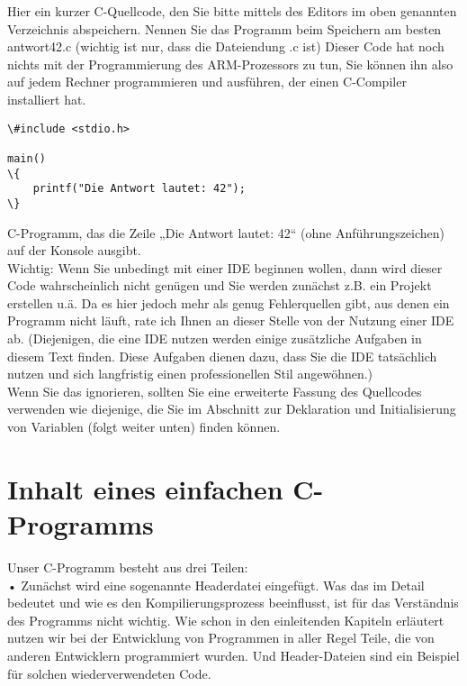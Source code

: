 Hier ein kurzer C-Quellcode, den Sie bitte mittels des Editors im oben genannten Verzeichnis abspeichern. Nennen Sie das Programm beim Speichern am besten antwort42.c (wichtig ist nur, dass die Dateiendung .c ist) Dieser Code hat noch nichts mit der Programmierung des ARM-Prozessors zu tun, Sie können ihn also auf jedem Rechner programmieren und ausführen, der einen C-Compiler installiert hat.\\

\begin{verbatim}
\#include <stdio.h>

main() 
\{
	printf("Die Antwort lautet: 42");
\}
\end{verbatim}

C-Programm, das die Zeile „Die Antwort lautet: 42“ (ohne Anführungszeichen) auf der Konsole ausgibt.\\

Wichtig: Wenn Sie unbedingt mit einer IDE beginnen wollen, dann wird dieser Code wahrscheinlich nicht genügen und Sie werden zunächst z.B. ein Projekt erstellen u.ä. Da es hier jedoch mehr als genug Fehlerquellen gibt, aus denen ein Programm nicht läuft, rate ich Ihnen an dieser Stelle von der Nutzung einer IDE ab. (Diejenigen, die eine IDE nutzen werden einige zusätzliche Aufgaben in diesem Text finden. Diese Aufgaben dienen dazu, dass Sie die IDE tatsächlich nutzen und sich langfristig einen professionellen Stil angewöhnen.)\\

Wenn Sie das ignorieren, sollten Sie eine erweiterte Fassung des Quellcodes verwenden wie diejenige, die Sie im Abschnitt zur Deklaration und Initialisierung von Variablen (folgt weiter unten) finden können.

\section{Inhalt eines einfachen C-Programms}

Unser C-Programm besteht aus drei Teilen: \\

•	Zunächst wird eine sogenannte Headerdatei eingefügt. Was das im Detail bedeutet und wie es den Kompilierungsprozess beeinflusst, ist für das Verständnis des Programms nicht wichtig. Wie schon in den einleitenden Kapiteln erläutert nutzen wir bei der Entwicklung von Programmen in aller Regel Teile, die von anderen Entwicklern programmiert wurden. Und Header-Dateien sind ein Beispiel für solchen wiederverwendeten Code.\\

